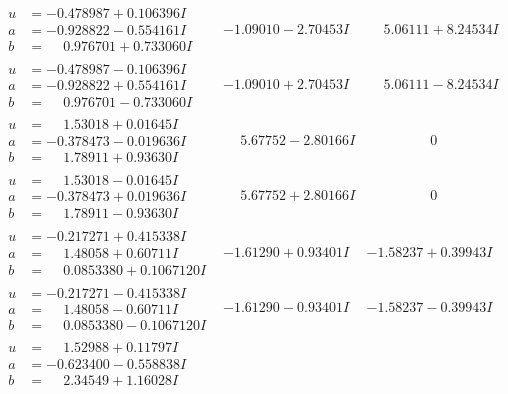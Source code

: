 \documentclass[1p]{elsarticle_modified}
\theoremstyle{definition}
\begin{document}
$$\begin{array}{c|c|c}
\begin{aligned}
u &= -0.478987 + 0.106396 I \\
a &= -0.928822 - 0.554161 I \\
b &= \phantom{-}0.976701 + 0.733060 I\end{aligned}
 & -1.09010 - 2.70453 I & \phantom{-}5.06111 + 8.24534 I \\ \hline\begin{aligned}
u &= -0.478987 - 0.106396 I \\
a &= -0.928822 + 0.554161 I \\
b &= \phantom{-}0.976701 - 0.733060 I\end{aligned}
 & -1.09010 + 2.70453 I & \phantom{-}5.06111 - 8.24534 I \\ \hline\begin{aligned}
u &= \phantom{-}1.53018 + 0.01645 I \\
a &= -0.378473 - 0.019636 I \\
b &= \phantom{-}1.78911 + 0.93630 I\end{aligned}
 & \phantom{-}5.67752 - 2.80166 I & \phantom{-0.000000 } 0 \\ \hline\begin{aligned}
u &= \phantom{-}1.53018 - 0.01645 I \\
a &= -0.378473 + 0.019636 I \\
b &= \phantom{-}1.78911 - 0.93630 I\end{aligned}
 & \phantom{-}5.67752 + 2.80166 I & \phantom{-0.000000 } 0 \\ \hline\begin{aligned}
u &= -0.217271 + 0.415338 I \\
a &= \phantom{-}1.48058 + 0.60711 I \\
b &= \phantom{-}0.0853380 + 0.1067120 I\end{aligned}
 & -1.61290 + 0.93401 I & -1.58237 + 0.39943 I \\ \hline\begin{aligned}
u &= -0.217271 - 0.415338 I \\
a &= \phantom{-}1.48058 - 0.60711 I \\
b &= \phantom{-}0.0853380 - 0.1067120 I\end{aligned}
 & -1.61290 - 0.93401 I & -1.58237 - 0.39943 I \\ \hline\begin{aligned}
u &= \phantom{-}1.52988 + 0.11797 I \\
a &= -0.623400 - 0.558838 I \\
b &= \phantom{-}2.34549 + 1.16028 I\end{aligned}

\end{array}$$
\end{document}

